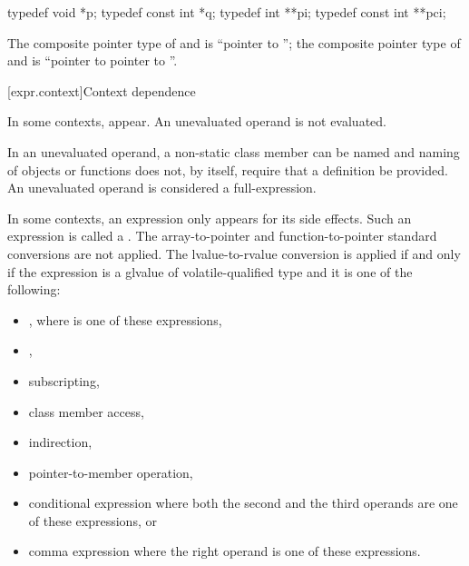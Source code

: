 \begin{example}
\begin{codeblock}
typedef void *p;
typedef const int *q;
typedef int **pi;
typedef const int **pci;
\end{codeblock}

The composite pointer type of  and  is ``pointer to ''; the
composite pointer type of  and  is ``pointer to  pointer to
''.
\end{example}

[expr.context]{Context dependence}

\pnum
\label{term.unevaluated.operand}%
In some contexts, 
appear.
An unevaluated operand is not evaluated.
\begin{note}
In an unevaluated operand, a non-static class member can be
named and naming of objects or functions does not, by
itself, require that a definition be provided.
An unevaluated operand is considered a full-expression.
\end{note}

\pnum
In some contexts, an expression only appears for its side effects. Such an
expression is called a .
The array-to-pointer
and function-to-pointer standard conversions are not
applied. The lvalue-to-rvalue conversion is applied
if and only if
the expression is a glvalue of volatile-qualified type and it is one of the
following:

\begin{itemize}
\item \tcode{(}  \tcode{)}, where
   is one of these expressions,
\item {},
\item subscripting,
\item class member access,
\item indirection,
\item pointer-to-member operation,
\item conditional expression where both the second and the
      third operands are one of these expressions, or
\item comma expression where the right operand is one of
      these expressions.
\end{itemize}

